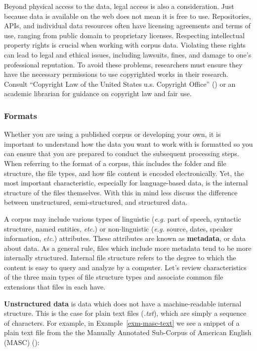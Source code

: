 \documentclass[
  letterpaper,
]{latex/krantz}
\theoremstyle{definition}
\theoremstyle{remark}
\begin{document}
Beyond physical access to the data, legal access is also a
consideration. Just because data is available on the web does not mean
it is free to use. Repositories, APIs, and individual data resources
often have licensing agreements and terms of use, ranging from public
domain to proprietary licenses. Respecting intellectual property rights
is crucial when working with corpus data. Violating these rights can
lead to legal and ethical issues, including lawsuits, fines, and damage
to one's professional reputation. To avoid these problems, researchers
must ensure they have the necessary permissions to use copyrighted works
in their research. Consult {``Copyright Law of the United States
{\textbar} u.s. Copyright Office''}
() or an academic
librarian for guidance on copyright law and fair use.

\subsubsection{Formats}\label{formats}

Whether you are using a published corpus or developing your own, it is
important to understand how the data you want to work with is formatted
so you can ensure that you are prepared to conduct the subsequent
processing steps. When referring to the format of a corpus, this
includes the folder and file structure, the file types, and how file
content is encoded electronically. Yet, the most important
characteristic, especially for language-based data, is the internal
structure of the files themselves. With this in mind less discuss the
difference between unstructured, semi-structured, and structured data.

A corpus may include various types of linguistic (\emph{e.g.} part of
speech, syntactic structure, named entities, \emph{etc.}) or
non-linguistic (\emph{e.g.} source, dates, speaker information,
\emph{etc.}) attributes. These attributes are known as
\textbf{metadata}, or data about data. As a general rule, files which
include more metadata tend to be more internally structured. Internal
file structure refers to the degree to which the content is easy to
query and analyze by a computer. Let's review characteristics of the
three main types of file structure types and associate common file
extensions that files in each have.

\textbf{Unstructured data} is data which does not have a
machine-readable internal structure. This is the case for plain text
files (\emph{.txt}), which are simply a sequence of characters. For
example, in Example~\ref{exm-masc-text} we see a snippet of a plain text
file from the the Manually Annotated Sub-Corpus of American English
(MASC) ():
\end{document}
